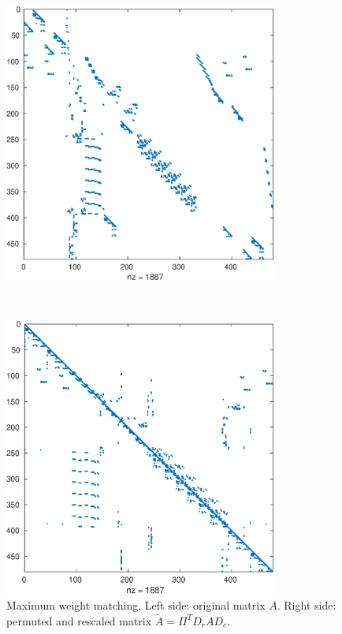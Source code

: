 \begin{figure}
 \centering
\begin{minipage}{.45\textwidth}
 \begin{center}
%
\includegraphics[width=0.8\textwidth]{figures/west0479} 
 \end{center}
\end{minipage}
~
\begin{minipage}{.45\textwidth}
  \begin{center}
%
\includegraphics[width=0.8\textwidth]{figures/west0479-match} 
 \end{center}  
\end{minipage}
    \caption{Maximum weight matching. Left side: original
      matrix $A$. Right side: permuted and rescaled matrix
      $\tilde A=\Pi^TD_rAD_c$.}
    \label{fig:mwm}
\end{figure}
